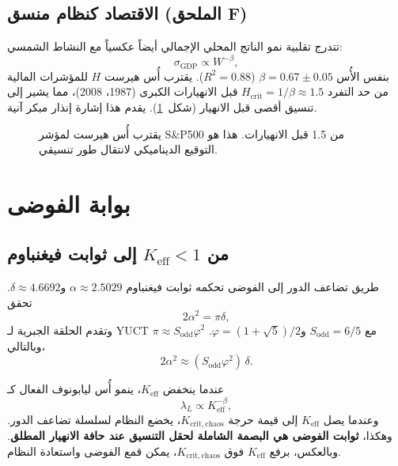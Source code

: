\documentclass[12pt,a4paper]{article}
\newcommand{\Keff}{K_{\mathrm{eff}}}
\begin{document}
	\subsection{الاقتصاد كنظام منسق (الملحق F)}
	تتدرج تقلبية نمو الناتج المحلي الإجمالي أيضاً عكسياً مع النشاط الشمسي:
	\[
	\sigma_{\text{GDP}} \propto W^{-\beta},
	\]
	بنفس الأُس \(\beta = 0.67 \pm 0.05\) (\(R^2 = 0.88\)). يقترب أُس هيرست \(H\) للمؤشرات المالية من حد التفرد \(H_{\text{crit}} = 1/\beta \approx 1.5\) قبل الانهيارات الكبرى (1987، 2008)، مما يشير إلى تنسيق أقصى قبل الانهيار (شكل~\ref{fig:hurst}). يقدم هذا إشارة إنذار مبكر آنية.
	
	\begin{otherlanguage}{english}
		\begin{figure}[H]
			\centering
			\caption{يقترب أُس هيرست لمؤشر S\&P500 من 1.5 قبل الانهيارات. هذا هو التوقيع الديناميكي لانتقال طور تنسيقي.}
			\label{fig:hurst}
		\end{figure}
	\end{otherlanguage}
	
	\section{بوابة الفوضى}
	\subsection{من \(\Keff < 1\) إلى ثوابت فيغنباوم}
	طريق تضاعف الدور إلى الفوضى تحكمه ثوابت فيغنباوم \(\alpha \approx 2.5029\) و\(\delta \approx 4.6692\). تحقق
	\[
	2\alpha^2 = \pi \delta,
	\]
	وتقدم الحلقة الجبرية لـ YUCT \(\pi \approx S_{\mathrm{odd}}\varphi^2\) مع \(S_{\mathrm{odd}}=6/5\) و\(\varphi = (1+\sqrt{5})/2\). وبالتالي،
	\[
	2\alpha^2 \approx (S_{\mathrm{odd}}\varphi^2)\,\delta.
	\]
	
	عندما ينخفض \(\Keff\)، ينمو أُس ليابونوف الفعال كـ
	\[
	\lambda_L \propto \Keff^{-\beta},
	\]
	وعندما يصل \(\Keff\) إلى قيمة حرجة \(K_{\mathrm{crit,chaos}}\)، يخضع النظام لسلسلة تضاعف الدور. وهكذا، \textbf{ثوابت الفوضى هي البصمة الشاملة لحقل التنسيق عند حافة الانهيار المطلق}. وبالعكس، برفع \(\Keff\) فوق \(K_{\mathrm{crit,chaos}}\)، يمكن قمع الفوضى واستعادة النظام.
	
\end{document}
